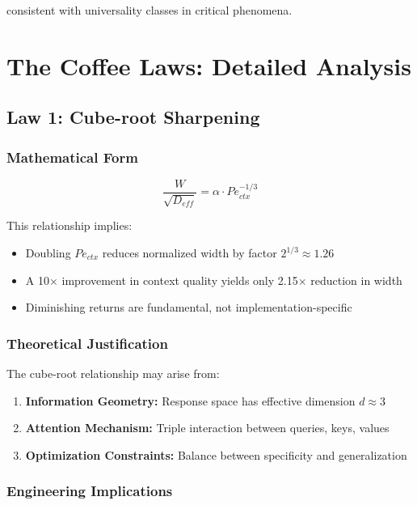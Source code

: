 \documentclass[conference]{IEEEtran}
\begin{document}
consistent with universality classes in critical phenomena.

\section{The Coffee Laws: Detailed Analysis}

\subsection{Law 1: Cube-root Sharpening}

\subsubsection{Mathematical Form}

\begin{equation}
\frac{W}{\sqrt{D_{eff}}} = \alpha \cdot Pe_{ctx}^{-1/3}
\end{equation}

This relationship implies:
\begin{itemize}
\item Doubling $Pe_{ctx}$ reduces normalized width by factor $2^{1/3} \approx 1.26$
\item A 10× improvement in context quality yields only 2.15× reduction in width
\item Diminishing returns are fundamental, not implementation-specific
\end{itemize}

\subsubsection{Theoretical Justification}

The cube-root relationship may arise from:
\begin{enumerate}
\item \textbf{Information Geometry:} Response space has effective dimension $d \approx 3$
\item \textbf{Attention Mechanism:} Triple interaction between queries, keys, values
\item \textbf{Optimization Constraints:} Balance between specificity and generalization
\end{enumerate}

\subsubsection{Engineering Implications}
\end{document}
